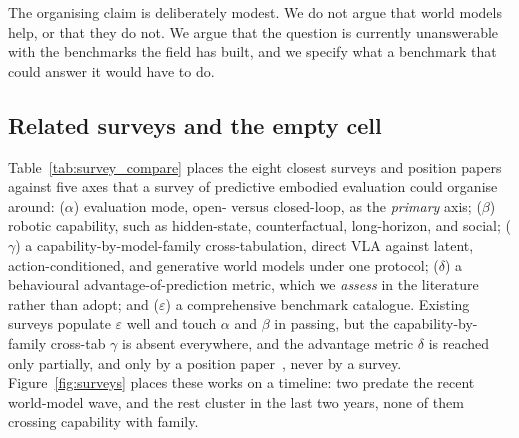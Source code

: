 \noindent The organising claim is deliberately modest. We do not argue that world models help, or
that they do not. We argue that the question is currently unanswerable with the benchmarks the field
has built, and we specify what a benchmark that could answer it would have to do.

\subsection{Related surveys and the empty cell}
\label{sec:related}

Table~\ref{tab:survey_compare} places the eight closest surveys and position papers against five axes
that a survey of predictive embodied evaluation could organise around: ($\alpha$) evaluation mode,
open- versus closed-loop, as the \emph{primary} axis; ($\beta$) robotic capability, such as
hidden-state, counterfactual, long-horizon, and social; ($\gamma$) a capability-by-model-family
cross-tabulation, direct VLA against latent, action-conditioned, and generative world models under
one protocol; ($\delta$) a behavioural advantage-of-prediction metric, which we \emph{assess} in the
literature rather than adopt; and ($\varepsilon$) a comprehensive benchmark catalogue. Existing
surveys populate $\varepsilon$ well and touch $\alpha$ and $\beta$ in passing, but the capability-by-family
cross-tab $\gamma$ is absent everywhere, and the advantage metric $\delta$ is reached only partially,
and only by a position paper~\cite{pos_yangyu}, never by a survey. Figure~\ref{fig:surveys} places
these works on a timeline: two predate the recent world-model wave, and the rest cluster in the last
two years, none of them crossing capability with family.



